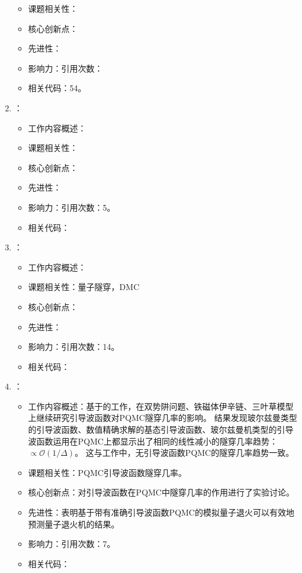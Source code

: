 \begin{enumerate}
\begin{itemize}
                \item 课题相关性：
                \item 核心创新点：
                \item 先进性：
                \item 影响力：引用次数：
                \item 相关代码：54。
            \end{itemize}
            \item \citet{pollet2018stochastic}：
            \begin{itemize}
                \item 工作内容概述：
                \item 课题相关性：
                \item 核心创新点：
                \item 先进性：
                \item 影响力：引用次数：5。
                \item 相关代码：
            \end{itemize}
            \item \citet{inack2018understanding}：
            \begin{itemize}
                \item 工作内容概述：
                \item 课题相关性：量子隧穿，DMC
                \item 核心创新点：
                \item 先进性：
                \item 影响力：引用次数：14。
                \item 相关代码：
            \end{itemize}
            \item \citet{parolini2019tunneling}：
            \begin{itemize}
                \item 工作内容概述：基于\citet{inack2018understanding}的工作，在双势阱问题、铁磁体伊辛链、三叶草模型上继续研究引导波函数对PQMC隧穿几率的影响。
                结果发现玻尔兹曼类型的引导波函数、数值精确求解的基态引导波函数、玻尔兹曼机类型的引导波函数运用在PQMC上都显示出了相同的线性减小的隧穿几率趋势：$\propto \mathcal{O}(1/\Delta)$。
                这与\citet{inack2018understanding}工作中，无引导波函数PQMC的隧穿几率趋势一致。
                \item 课题相关性：PQMC引导波函数隧穿几率。
                \item 核心创新点：对引导波函数在PQMC中隧穿几率的作用进行了实验讨论。
                \item 先进性：表明基于带有准确引导波函数PQMC的模拟量子退火可以有效地预测量子退火机的结果。
                \item 影响力：引用次数：7。
                \item 相关代码：
            \end{itemize}
    \end{enumerate}
    

